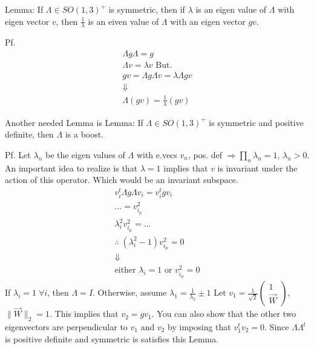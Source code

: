 Lemma: If $\Lambda \in SO(1, 3)^+$ is symmetric, then if
$\lambda$ is an eigen value of $\Lambda$ with eigen vector $v$, then
$\frac{1}{\lambda}$ is an eiven value of $\Lambda$ with an eigen vector $gv$.

Pf.
\begin{align*}
    \Lambda g \Lambda = g \\
    \Lambda v = \lambda v \text{ But. } \\
    gv = \Lambda g \Lambda v = \lambda \Lambda g v \\
    \Downarrow \\
    \Lambda \left(gv\right) = \frac{1}{\lambda} \left(gv\right)
\end{align*}

Another needed Lemma is
Lemma: If $\Lambda \in SO(1,3)^+$ is symmetric and positive definite, then
$\Lambda$ is a boost.

Pf.
Let $\lambda_n$ be the eigen values of $\Lambda$ with e.vecs $v_n$,
pos. def $\Rightarrow \prod_n \lambda_n = 1$, $\lambda_n > 0$. An important
idea to realize is that $\lambda = 1$ implies that $v$ is invariant under the action
of this operator. Which would be an invariant subspace.
\begin{align*}
    v_i^t \Lambda g \Lambda v_i = v_i^t g v_i \\
    \dots = v_{i_{\mu}}^2 \\
    \lambda_i^2 v_{i_{\mu}}^2 = \dots \\
    \therefore \; \left(\lambda_i^2 - 1\right) v_{i_{\mu}}^2 = 0
    \\\Downarrow\\
    \text{either } \lambda_i = 1 \text{ or } v_{i_{\mu}}^2 = 0
\end{align*}
If $\lambda_i = 1 \; \forall i$, then $\Lambda = I$.
Otherwise, assume $\lambda_1 = \frac{1}{\lambda_2} \pm 1$
Let $v_1 = \frac{1}{\sqrt{2}} \begin{pmatrix} 1 \\ \vec{W} \end{pmatrix}$, 
$\lVert \vec{W} \rVert_2 = 1$. This implies that
$v_2 = gv_1$. You can also show that the other two eigenvectors
are perpendicular to $v_1$ and $v_2$ by imposing that $v_1^t v_2 = 0$.
Since $\Lambda \Lambda^t$ is positive definite and symmetric is satisfies this Lemma.

